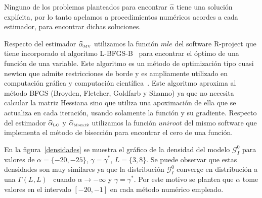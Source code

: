 Ninguno de los problemas planteados para encontrar $\widehat{\alpha}$ tiene una solución explícita, por lo tanto apelamos a procedimientos numéricos acordes a cada estimador, para encontrar dichas soluciones. 

Respecto del estimador $\widehat{\alpha}_{{\text{\tiny{MV}}}}$ utilizamos la función $mle$ del software R-project que tiene incorporado el algoritmo L-BFGS-B~\cite{Byrd1995} para encontrar el óptimo de una función de una variable. Este algoritmo es un método de optimización tipo cuasi newton que admite restricciones de borde y es ampliamente utilizado en computación gráfica y computación científica~\cite{Fei2014}. Este algoritmo aproxima al método BFGS (Broyden, Fletcher, Goldfarb y Shanno) ya que no necesita calcular la matriz Hessiana sino que utiliza una apoximación de ella que se actualiza en cada iteración, usando solamente la función y su gradiente. 
Respecto del estimador $\widehat{\alpha}_{{\text{\tiny{LC}}}}$ y $\widehat{\alpha}_{{\text{\tiny{Mom12}}}}$ utilizamos la función $uniroot$ del mismo software que implementa el método de bisección para encontrar el cero de una función.




En la figura~\ref{densidades} se muestra el gráfico de la densidad del modelo $\mathcal{G}_I^0$ para valores de $\alpha=\{-20,-25\}$, $\gamma=\gamma^*$, $L=\{3,8\}$. Se puede observar que estas densidades son muy similares ya que la distribución $\mathcal{G}_I^0$ converge en distribución a una $\Gamma(L,L)$~\cite{Frery99} cuando $\alpha \longrightarrow -\infty$ y $\gamma=\gamma^*$. Por este motivo se plantea que $\alpha$ tome valores en el intervalo $[-20,-1]$ en cada método numérico empleado. 

